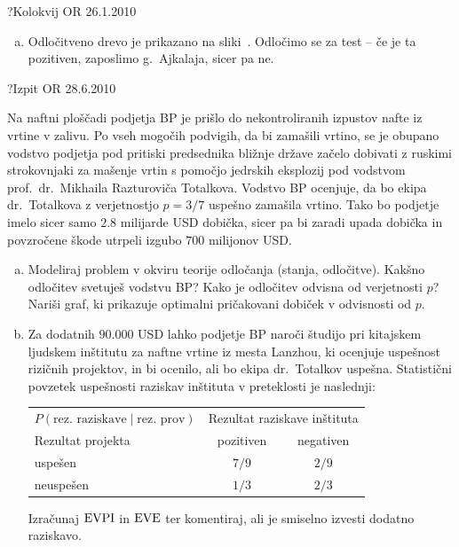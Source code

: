 \begin{naloga}{?}{Kolokvij OR 26.1.2010}
\begin{odgovor}
\begin{enumerate}[(a)]
\item Odločitveno drevo je prikazano na sliki~.
Odločimo se za test -- če je ta pozitiven, zaposlimo g.~Ajkalaja, sicer pa ne.
\end{enumerate}

\begin{slika}
\end{slika}

\begin{slika}
\end{slika}
\end{odgovor}
\end{naloga}


\begin{naloga}{?}{Izpit OR 28.6.2010}
\begin{vprasanje}[bp]
Na naftni ploščadi podjetja BP
je prišlo do nekontroliranih izpustov nafte iz vrtine v zalivu.
Po vseh mogočih podvigih, da bi zamašili vrtino,
se je ob\-upa\-no vodstvo podjetja pod pritiski predsednika bližnje države
začelo dobivati z ruskimi strokovnjaki
za mašenje vrtin s pomočjo jedrskih eksplozij pod vodstvom
prof.~dr.~Mikhaila Razturoviča Totalkova.
Vodstvo BP ocenjuje, da bo ekipa dr.~Totalkova
z verjetnostjo $p = 3/7$ uspešno zamašila vrtino.
Tako bo podjetje imelo sicer samo $2.8$ milijarde USD dobička,
sicer pa bi zaradi upada dobička in povzročene škode
utrpeli izgubo $700$ milijonov USD.

\begin{enumerate}[(a)]
\item Modeliraj problem v okviru teorije odločanja (stanja, odločitve).
Kakšno odločitev svetuješ vodstvu BP?
Kako je odločitev odvisna od verjetnosti $p$?
Nariši graf, ki prikazuje optimalni pričakovani dobiček v odvisnosti od $p$.

\item Za dodatnih $90.000$ USD lahko podjetje BP naroči študijo
pri kitajskem ljudskem inštitutu za naftne vrtine iz mesta Lanzhou,
ki ocenjuje uspešnost rizičnih projektov,
in bi ocenilo, ali bo ekipa dr.~Totalkov uspešna.
Statistični povzetek uspešnosti raziskav inštituta v preteklosti je naslednji:
\begin{center}
\begin{tabular}{l|cc}
$P(\text{rez.~raziskave} \;|\; \text{rez.~prov})$ &
\multicolumn{2}{c}{Rezultat raziskave inštituta} \\
Rezultat projekta & pozitiven & negativen \\ \hline
uspešen   &  $7/9$ & $2/9$ \\
neuspešen &  $1/3$ & $2/3$
\end{tabular}
\end{center}
Izračunaj $\operatorname{EVPI}$ in $\operatorname{EVE}$ ter komentiraj,
ali je smiselno izvesti dodatno raz\-iska\-vo.


\end{enumerate}
\end{vprasanje}
\end{naloga}
